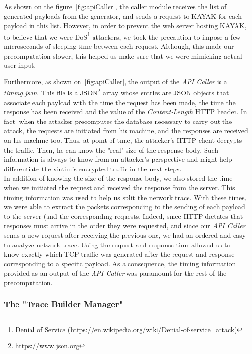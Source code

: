 \documentclass[runningheads]{llncs}
\begin{document}
As shown on the figure~\ref{fig:apiCaller}, the caller module receives the list of generated payloads from the generator, and sends a request to KAYAK for each payload in this list. However, in order to prevent the web server hosting KAYAK, to believe that we were DoS\footnote{Denial of Service (https://en.wikipedia.org/wiki/Denial-of-service\_attack)} attackers, we took the precaution to impose a few microseconds of sleeping time between each request. Although, this made our precomputation slower, this helped us make sure that we were mimicking actual user input.

\medskip

Furthermore, as shown on~\ref{fig:apiCaller}, the output of the \emph{API Caller} is a \emph{timing.json}. This file is a JSON\footnote{https://www.json.org} array whose entries are JSON objects that associate each payload with the time the request has been made, the time the response has been received and the value of the \emph{Content-Length} HTTP header. In fact, when the attacker precomputes the database necessary to carry out the attack, the requests are initiated from his machine, and the responses are received on his machine too. Thus, at point of time, the attacker's HTTP client decrypts the traffic. Then, he can know the "real" size of the response body. Such information is always to know from an attacker's perspective and might help differentiate the victim's encrypted traffic in the next steps. \\
In addition of knowing the size of the response body, we also stored the time when we initiated the request and received the response from the server. This timing information was used to help us split the network trace. With these times, we were able to extract the packets corresponding to the sending of each payload to the server (and the corresponding requests. Indeed, since HTTP dictates that responses must arrive in the order they were requested, and since our \emph{API Caller} sends a new request after receiving the previous one, we had an ordered and easy-to-analyze network trace. Using the request and response time allowed us to know exactly which TCP traffic was generated after the request and response corresponding to a specific payload. As a consequence, the timing information provided as an output of the \emph{API Caller} was paramount for the rest of the precomputation.

\bigskip

\subsubsection*{The "Trace Builder Manager"}
\end{document}
